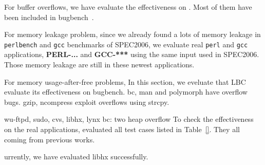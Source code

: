For buffer overflows, we have evaluate the effectiveness on  . Most of them have been included in
bugbench~\cite{}. 

For memory leakage problem, since we already found a lots of memory leakage in \texttt{perlbench}
and \texttt{gcc} benchmarks of SPEC2006, we evaluate real \texttt{perl} and \texttt{gcc} applications, {\bf PERL-... } and {\bf GCC-***} using the same input used in SPEC2006. 
Those memory leakage are still in these newest applications. 

For memory usage-after-free problems, 
In this section, we eveluate that 
LBC evaluate its effectiveness on bugbench.
bc, man and polymorph have overflow bugs.
gzip, ncompress exploit overflows using strcpy. 


wu-ftpd, sudo, cvs, libhx, lynx
bc: two heap overflow
To check the effectiveness on the real applications, \doubletake{} evaluated all test cases listed in Table~\ref{}. They all coming from previous works. 


urrently, we have evaluated libhx successfully.

